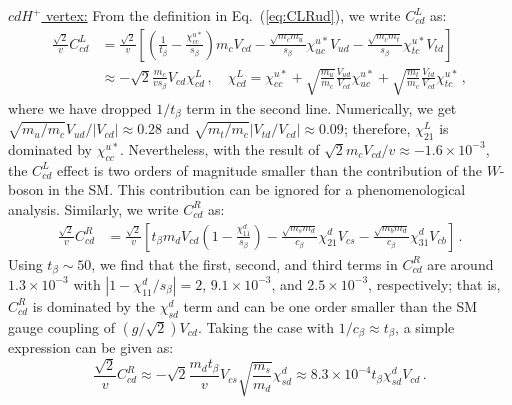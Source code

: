 \documentclass[prd,preprint,superscriptaddress,amsmath,amssymb]{revtex4}
\begin{document}
   \underline {$cd H^+$ vertex:} From the definition in Eq.~(\ref{eq:CLRud}), we write $C^L_{cd}$ as:
 \begin{align}
 \frac{\sqrt{2}}{v} C^{L}_{cd} & = \frac{\sqrt{2}}{v} \left[ \left(\frac{1}{t_\beta} -\frac{\chi^{u*}_{cc}}{s_\beta} \right) m_c V_{cd} - \frac{\sqrt{m_c m_u}}{s_\beta} \chi^{u*}_{uc} V_{ud} - \frac{\sqrt{m_c m_t}}{s_\beta} \chi^{u*}_{tc} V_{td}\right] \nonumber \\
 & \approx - \sqrt{2} \frac{m_c}{v s_\beta} V_{cd} \chi^L_{cd}\,, \quad \chi^L_{cd} = \chi^{u*}_{cc} + \sqrt{\frac{m_u}{m_c}}\frac{V_{ud}}{V_{cd}}  \chi^{u*}_{uc}  + \sqrt{\frac{m_t}{m_c}}\frac{V_{td}}{V_{cd}}  \chi^{u*}_{tc} \,,
 \end{align}
 where we have dropped $1/t_\beta$ term in the second line. Numerically, we get $\sqrt{ m_u/m_c} V_{ud}/|V_{cd}|\approx 0.28$ and   $\sqrt{m_t/m_c}|V_{td}/V_{cd}|\approx 0.09$; therefore, $\chi^L_{21}$ is dominated by $\chi^{u*}_{cc}$. Nevertheless, with the result of $\sqrt{2} m_c V_{cd} /v \approx -1.6\times 10^{-3}$, the $C^L_{cd}$ effect is two orders of magnitude smaller than the contribution of the $W$-boson in the SM. This contribution can be ignored for a phenomenological analysis. Similarly, we write $C^R_{cd}$ as:
 \begin{align}
 \frac{\sqrt{2}}{v} C^{R}_{cd} &= \frac{\sqrt{2}}{v} \left[ t_\beta m_d V_{cd} \left( 1 -\frac{\chi^{d}_{11}}{s_\beta} \right)  - \frac{\sqrt{m_s m_d}}{c_\beta} \chi^{d}_{21} V_{cs} - \frac{\sqrt{m_b m_d}}{c_\beta} \chi^{d}_{31} V_{cb}\right]\,.
  \end{align}
Using $t_\beta \sim 50$, we find that the first, second, and third terms in $C^R_{cd}$ are  around $1.3\times 10^{-3}$ with $|1-\chi^d_{11}/s_\beta|=2$, $9.1 \times 10^{-3}$, and $2.5 \times 10^{-3}$, respectively; that is, $C^R_{cd}$ is dominated by the $\chi^d_{sd}$ term and can be one order smaller than the SM gauge coupling of $(g/\sqrt{2}) V_{cd}$.  Taking the case with $1/c_\beta \approx t_\beta$, a simple expression can be given as:
 \begin{equation}
 \frac{\sqrt{2}}{v} C^R_{cd} \approx -\sqrt{2} \frac{m_d t_\beta }{v} V_{cs} \sqrt{\frac{m_s}{m_d}} \chi^d_{sd} \approx 8.3\times 10^{-4} t_\beta \chi^d_{sd} V_{cd}\,.
  \end{equation}
\end{document}
